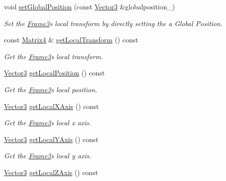 \begin{DoxyCompactItemize}
void \hyperlink{class_i_dream_sky_1_1_frame3_a6b3168f32b01c1cc8b12eebaf5c24c68}{set\+Global\+Position} (const \hyperlink{class_i_dream_sky_1_1_vector3}{Vector3} \&globalposition\+\_\+)
\begin{DoxyCompactList}\small\item\em Set the \hyperlink{class_i_dream_sky_1_1_frame3}{Frame3}\textquotesingle{}s local transform by directly setting the a Global Position. \end{DoxyCompactList}\item 
const \hyperlink{class_i_dream_sky_1_1_matrix4}{Matrix4} \& \hyperlink{class_i_dream_sky_1_1_frame3_a024b5f957cbb324a48e16b264d960410}{get\+Local\+Transform} () const 
\begin{DoxyCompactList}\small\item\em Get the \hyperlink{class_i_dream_sky_1_1_frame3}{Frame3}\textquotesingle{}s local transform. \end{DoxyCompactList}\item 
\hyperlink{class_i_dream_sky_1_1_vector3}{Vector3} \hyperlink{class_i_dream_sky_1_1_frame3_ad24c8641061003aa681a85e22ba80f3b}{get\+Local\+Position} () const 
\begin{DoxyCompactList}\small\item\em Get the \hyperlink{class_i_dream_sky_1_1_frame3}{Frame3}\textquotesingle{}s local position. \end{DoxyCompactList}\item 
\hyperlink{class_i_dream_sky_1_1_vector3}{Vector3} \hyperlink{class_i_dream_sky_1_1_frame3_a66b3a75ce99c82cc6568598e4586e474}{get\+Local\+X\+Axis} () const 
\begin{DoxyCompactList}\small\item\em Get the \hyperlink{class_i_dream_sky_1_1_frame3}{Frame3}\textquotesingle{}s local x axis. \end{DoxyCompactList}\item 
\hyperlink{class_i_dream_sky_1_1_vector3}{Vector3} \hyperlink{class_i_dream_sky_1_1_frame3_ad8865148b70218e99bc164e096386911}{get\+Local\+Y\+Axis} () const 
\begin{DoxyCompactList}\small\item\em Get the \hyperlink{class_i_dream_sky_1_1_frame3}{Frame3}\textquotesingle{}s local y axis. \end{DoxyCompactList}\item 
\hyperlink{class_i_dream_sky_1_1_vector3}{Vector3} \hyperlink{class_i_dream_sky_1_1_frame3_ac8ec84b150a39cf6969902fcfdcd764e}{get\+Local\+Z\+Axis} () const 

\end{DoxyCompactItemize}
